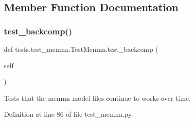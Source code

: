 \subsection{Member Function Documentation}
\mbox{\label{classtests_1_1test__memnn_1_1TestMemnn_a2c3a2e42a94e00651ee32a03d9b7ba84}} 
\subsubsection{\texorpdfstring{test\+\_\+backcomp()}{test\_backcomp()}}
{\footnotesize\ttfamily def tests.\+test\+\_\+memnn.\+Test\+Memnn.\+test\+\_\+backcomp (\begin{DoxyParamCaption}\item[{}]{self }\end{DoxyParamCaption})}

\begin{DoxyVerb}Tests that the memnn model files continue to works over time.
\end{DoxyVerb}
 

Definition at line 86 of file test\+\_\+memnn.\+py.


